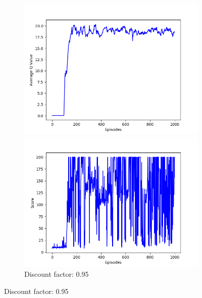 \documentclass{article}
\begin{document}
\begin{figure}[!htbp]
  \begin{subfigure}{\textwidth}
    \begin{minipage}{0.5\textwidth}
      \centering
      \includegraphics[scale=0.45]{../experiments/discount_factor_095/qvalues.png}
    \end{minipage}
    \begin{minipage}{0.5\textwidth}
      \centering
      \includegraphics[scale=0.45]{../experiments/discount_factor_095/scores.png}
    \end{minipage}
    \caption{Discount factor: 0.95}
  \end{subfigure}%


\end{figure}
\end{document}
